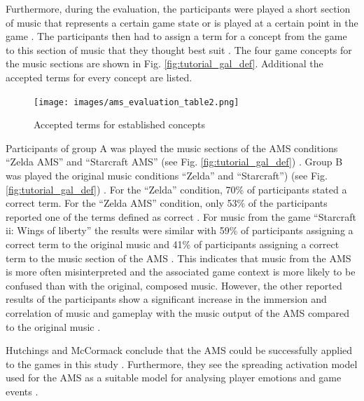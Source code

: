 Furthermore, during the evaluation, the participants were played a short section of music that represents a certain game state or is played at a certain point in the game \cite{hutMcCormAms}. The participants then had to assign a term for a concept from the game to this section of music that they thought best suit \cite{hutMcCormAms}. The four game concepts for the music sections are shown in Fig. \ref{fig:tutorial_gal_def}. Additional the accepted terms for every concept are listed. 
\begin{figure}
    \centering
    \texttt{[image: images/ams\_evaluation\_table2.png]}
    \caption{Accepted terms for established concepts \cite{hutMcCormAms}}
    \label{fig:ams_evaluation_table2}
\end{figure}
Participants of group A was played the music sections of the AMS conditions “Zelda AMS” and “Starcraft AMS” (see Fig. \ref{fig:tutorial_gal_def}) \cite{hutMcCormAms}. Group B was played the original music conditions “Zelda” and “Starcraft”) (see Fig. \ref{fig:tutorial_gal_def}) \cite{hutMcCormAms}.
For the “Zelda” condition, 70\% of participants stated a correct term. For the “Zelda AMS” condition, only 53\% of the participants reported one of the terms defined as correct \cite{hutMcCormAms}.
For music from the game “Starcraft ii: Wings of liberty” the results were similar with 59\% of participants assigning a correct term to the original music and 41\% of participants assigning a correct term to the music section of the AMS \cite{hutMcCormAms}.
This indicates that music from the AMS is more often misinterpreted and the associated game context is more likely to be confused than with the original, composed music.
However, the other reported results of the participants show a significant increase in the immersion and correlation of music and gameplay with the music output of the AMS compared to the original music \cite{hutMcCormAms}.

Hutchings and McCormack conclude that the AMS could be successfully applied to the games in this study \cite{hutMcCormAms}. Furthermore, they see the spreading activation model used for the AMS as a suitable model for analysing player emotions and game events \cite{hutMcCormAms}.

